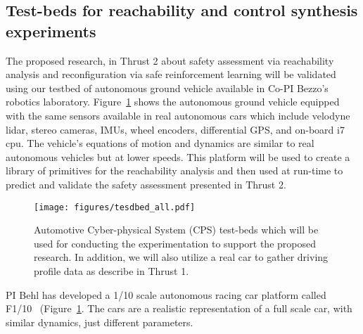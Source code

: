 \subsection{Test-beds for reachability and control synthesis experiments}
The proposed research, in Thrust 2 about safety assessment via reachability analysis and reconfiguration via safe reinforcement learning will be validated using our testbed of autonomous ground vehicle available in Co-PI Bezzo's robotics laboratory. 
Figure~\ref{fig:all_experiments} shows the autonomous ground vehicle equipped with the same sensors available in real autonomous cars which include velodyne lidar, stereo cameras, IMUs, wheel encoders, differential GPS, and on-board i7 cpu. The vehicle's equations of motion and dynamics are similar to real autonomous vehicles but at lower speeds. This platform will be used to create a library of primitives for the reachability analysis and then used at run-time to predict and validate the safety assessment presented in Thrust 2. 
\begin{figure}
    \centering
    \texttt{[image: figures/tesdbed\_all.pdf]}
    \caption{Automotive Cyber-physical System (CPS) test-beds which will be used for conducting the experimentation to support the proposed research. In addition, we will also utilize a real car to gather driving profile data as describe in Thrust 1. }
    \label{fig:all_experiments}
\end{figure}
PI Behl has developed a 1/10 scale autonomous racing car platform called F1/10~\cite{f1tenth} (Figure~\ref{fig:all_experiments}. The cars are a realistic representation of a full scale car, with similar dynamics, just different parameters. %
